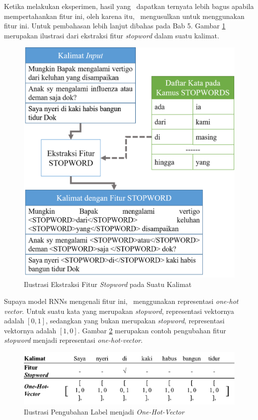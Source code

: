 \begin{enumerate}
	Ketika melakukan eksperimen, hasil yang \saya~dapatkan ternyata lebih bagus apabila mempertahankan fitur ini, oleh karena itu, \saya~mengusulkan untuk menggunakan fitur ini. Untuk pembahasan lebih lanjut dibahas pada Bab 5. Gambar \ref{fig:fiturstopword} merupakan ilustrasi dari ekstraksi fitur \textit{stopword} dalam suatu kalimat.
	
	\begin{figure}
		\centering
		\includegraphics[width=0.70\linewidth]{images/fiturstopword}
		\caption{Ilustrasi Ekstraksi Fitur \textit{Stopword} pada Suatu Kalimat}
		\label{fig:fiturstopword}
	\end{figure}
	
	Supaya model RNNs mengenali fitur ini, \saya~menggunakan representasi \textit{one-hot vector}. Untuk suatu kata yang merupakan \textit{stopword}, representasi vektornya adalah $ [0, 1] $, sedangkan yang bukan merupakan \textit{stopword}, representasi vektornya adalah $ [1, 0] $. Gambar \ref{fig:stopwordtoone} merupakan contoh pengubahan fitur \textit{stopword} menjadi representasi \textit{one-hot-vector}.
	
	\begin{figure}
		\centering
		\includegraphics[width=0.85\linewidth]{images/stopwordtoone}
		\caption{Ilustrasi Pengubahan Label menjadi \textit{One-Hot-Vector}}
		\label{fig:stopwordtoone}
	\end{figure}
	

\end{enumerate}
